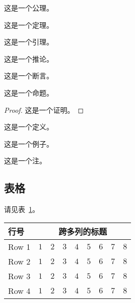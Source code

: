 \begin{axiom}
   这是一个公理。 
\end{axiom}
\begin{theorem}
   这是一个定理。 
\end{theorem}
\begin{lemma}
   这是一个引理。 
\end{lemma}
\begin{corollary}
   这是一个推论。 
\end{corollary}
\begin{assertion}
   这是一个断言。 
\end{assertion}
\begin{proposition}
   这是一个命题。 
\end{proposition}
\begin{proof}
    这是一个证明。
\end{proof}
\begin{definition}
    这是一个定义。
\end{definition}
\begin{example}
    这是一个例子。
\end{example}
\begin{remark}
    这是一个注。
\end{remark}

\subsection{表格}

请见表~\ref{tab:sample}。
\begin{table}[!htbp]
    \label{tab:sample}
    \centering
    \footnotesize%
    \setlength{\tabcolsep}{4pt}%
    \renewcommand{\arraystretch}{1.2}%
    \begin{tabular}{lcccccccc}
        \hline
        行号 & \multicolumn{8}{c}{跨多列的标题}\\
        \hline
        Row 1 & $1$ & $2$ & $3$ & $4$ & $5$ & $6$ & $7$ & $8$\\
        Row 2 & $1$ & $2$ & $3$ & $4$ & $5$ & $6$ & $7$ & $8$\\
        Row 3 & $1$ & $2$ & $3$ & $4$ & $5$ & $6$ & $7$ & $8$\\
        Row 4 & $1$ & $2$ & $3$ & $4$ & $5$ & $6$ & $7$ & $8$\\
        \hline
    \end{tabular}
\end{table}

